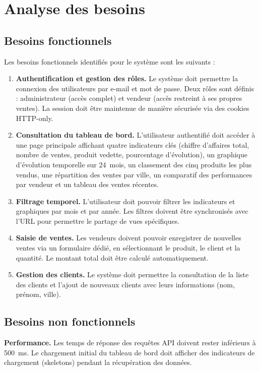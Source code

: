 \documentclass[11pt,a4paper]{report}
\begin{document}
\chapter{Analyse des besoins}

\section{Besoins fonctionnels}
Les besoins fonctionnels identifiés pour le système sont les suivants :
\begin{enumerate}
  \item \textbf{Authentification et gestion des rôles.} Le système doit
        permettre la connexion des utilisateurs par e-mail et mot de passe. Deux
        rôles sont définis : administrateur (accès complet) et vendeur (accès
        restreint à ses propres ventes). La session doit être maintenue de
        manière sécurisée via des cookies HTTP-only.
  \item \textbf{Consultation du tableau de bord.} L'utilisateur authentifié doit
        accéder à une page principale affichant quatre indicateurs clés (chiffre
        d'affaires total, nombre de ventes, produit vedette, pourcentage
        d'évolution), un graphique d'évolution temporelle sur 24~mois, un
        classement des cinq produits les plus vendus, une répartition des ventes
        par ville, un comparatif des performances par vendeur et un tableau des
        ventes récentes.
  \item \textbf{Filtrage temporel.} L'utilisateur doit pouvoir filtrer les
        indicateurs et graphiques par mois et par année. Les filtres doivent
        être synchronisés avec l'URL pour permettre le partage de vues
        spécifiques.
  \item \textbf{Saisie de ventes.} Les vendeurs doivent pouvoir enregistrer de
        nouvelles ventes via un formulaire dédié, en sélectionnant le produit,
        le client et la quantité. Le montant total doit être calculé
        automatiquement.
  \item \textbf{Gestion des clients.} Le système doit permettre la consultation
        de la liste des clients et l'ajout de nouveaux clients avec leurs
        informations (nom, prénom, ville).
\end{enumerate}

\section{Besoins non fonctionnels}
\textbf{Performance.} Les temps de réponse des requêtes API doivent rester
inférieurs à 500~ms. Le chargement initial du tableau de bord doit afficher des
indicateurs de chargement (skeletons) pendant la récupération des données.
\end{document}

